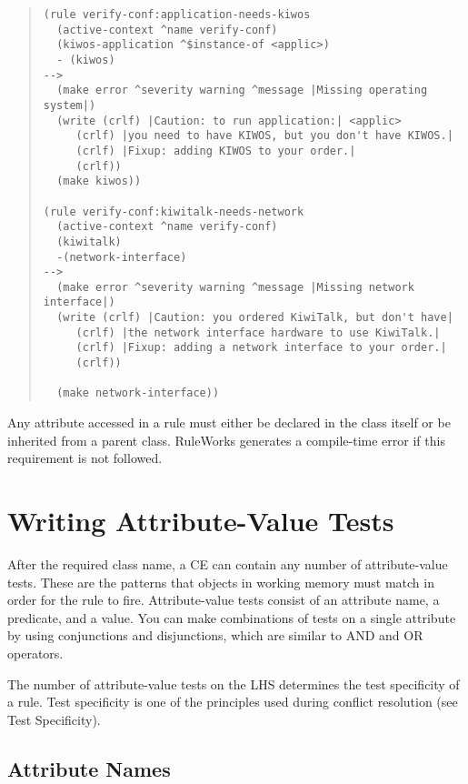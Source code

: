 \begin{quote}
\begin{verbatim}
(rule verify-conf:application-needs-kiwos
  (active-context ^name verify-conf)
  (kiwos-application ^$instance-of <applic>)
  - (kiwos)
-->
  (make error ^severity warning ^message |Missing operating system|)
  (write (crlf) |Caution: to run application:| <applic>
     (crlf) |you need to have KIWOS, but you don't have KIWOS.|
     (crlf) |Fixup: adding KIWOS to your order.|
     (crlf))
  (make kiwos))

(rule verify-conf:kiwitalk-needs-network
  (active-context ^name verify-conf)
  (kiwitalk)
  -(network-interface)
-->
  (make error ^severity warning ^message |Missing network interface|)
  (write (crlf) |Caution: you ordered KiwiTalk, but don't have|
     (crlf) |the network interface hardware to use KiwiTalk.|
     (crlf) |Fixup: adding a network interface to your order.|
     (crlf))

  (make network-interface))
\end{verbatim}
\end{quote}

\begin{note}
  Any attribute accessed in a rule must either be declared in the
  class itself or be inherited from a parent class. RuleWorks
  generates a compile-time error if this requirement is not followed.
\end{note}

\section{Writing Attribute-Value Tests}

After the required class name, a CE can contain any number of
attribute-value tests. These are the patterns that objects in working
memory must match in order for the rule to fire. Attribute-value tests
consist of an attribute name, a predicate, and a value. You can make
combinations of tests on a single attribute by using conjunctions and
disjunctions, which are similar to AND and OR operators.

The number of attribute-value tests on the LHS determines the test
specificity of a rule. Test specificity is one of the principles used
during conflict resolution (see Test Specificity).

\subsection{Attribute Names}

